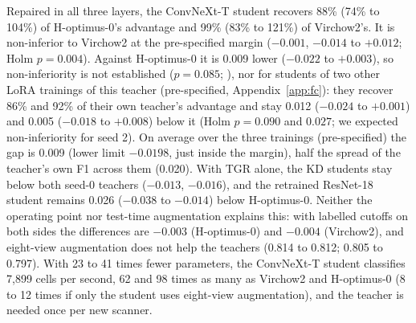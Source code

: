 Repaired in all three layers, the ConvNeXt-T student recovers 88\% (74\% to 104\%)
of H-optimus-0's advantage and 99\% (83\% to 121\%) of Virchow2's. It is non-inferior to Virchow2 at the pre-specified
margin ($-0.001$, $-0.014$ to $+0.012$; Holm $p=0.004$). Against H-optimus-0 it is 0.009 lower ($-0.022$ to $+0.003$),
so non-inferiority is not established ($p=0.085$; ), nor for students of two other LoRA
trainings of this teacher (pre-specified, Appendix~\ref{app:fc}): they recover 86\% and 92\% of their own teacher's
advantage and stay 0.012 ($-0.024$ to $+0.001$) and 0.005 ($-0.018$ to $+0.008$) below it (Holm $p=0.090$ and
$0.027$; we expected non-inferiority for seed 2). On average over the three trainings (pre-specified) the gap is 0.009 (lower limit
$-0.0198$, just inside the margin), half the spread of the teacher's own F1 across them (0.020). With TGR alone, the KD
students stay below both seed-0 teachers ($-0.013$, $-0.016$), and the retrained ResNet-18 student remains 0.026
($-0.038$ to $-0.014$) below H-optimus-0. Neither the operating point nor test-time augmentation explains this: with labelled cutoffs on both sides
the differences are $-0.003$ (H-optimus-0) and $-0.004$ (Virchow2), and eight-view augmentation does not help the
teachers (0.814 to 0.812; 0.805 to 0.797). With 23 to 41 times fewer parameters, the
ConvNeXt-T student classifies 7{,}899 cells per second, 62 and 98 times as many as Virchow2 and H-optimus-0 (8 to 12
times if only the student uses eight-view augmentation), and the teacher is needed once per new scanner.
